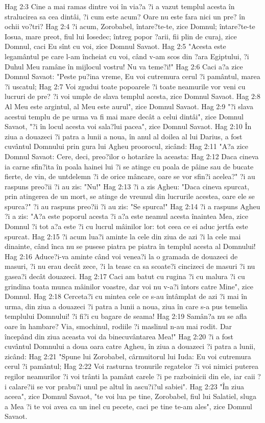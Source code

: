 Hag 2:3  Cine a mai ramas dintre voi în via?a ?i a vazut templul acesta în stralucirea sa cea dintâi, ?i cum este acum? Oare nu este fara nici un pre? în ochii vo?tri?
Hag 2:4  ?i acum, Zorobabel, întare?te-te, zice Domnul; întare?te-te Iosua, mare preot, fiul lui Iosedec; întreg popor ?arii, fii plin de curaj, zice Domnul, caci Eu sînt cu voi, zice Domnul Savaot.
Hag 2:5  "Acesta este legamântul pe care l-am încheiat cu voi, când v-am scos din ?ara Egiptului, ?i Duhul Meu ramâne în mijlocul vostru! Nu va teme?i!"
Hag 2:6  Caci a?a zice Domnul Savaot: "Peste pu?ina vreme, Eu voi cutremura cerul ?i pamântul, marea ?i uscatul;
Hag 2:7  Voi zgudui toate popoarele ?i toate neamurile vor veni cu lucruri de pre? ?i voi umple de slava templul acesta, zice Domnul Savaot.
Hag 2:8  Al Meu este argintul, al Meu este aurul", zice Domnul Savaot.
Hag 2:9  "?i slava acestui templu de pe urma va fi mai mare decât a celui dintâi", zice Domnul Savaot, "?i în locul acesta voi sala?lui pacea", zice Domnul Savaot.
Hag 2:10  În ziua a douazeci ?i patra a lunii a noua, în anul al doilea al lui Darius, a fost cuvântul Domnului prin gura lui Agheu proorocul, zicând:
Hag 2:11  "A?a zice Domnul Savaot: Cere, deci, preo?ilor o hotarâre la aceasta:
Hag 2:12  Daca cineva ia carne sfin?ita în poala hainei lui ?i se atinge cu poala de pâine sau de bucate fierte, de vin, de untdelemn ?i de orice mâncare, oare se vor sfin?i acelea?" ?i au raspuns preo?ii ?i au zis: "Nu!"
Hag 2:13  ?i a zis Agheu: "Daca cineva spurcat, prin atingerea de un mort, se atinge de vreunul din lucrurile acestea, oare ele se spurca?" ?i au raspuns preo?ii ?i au zis: "Se spurca!"
Hag 2:14  ?i a raspuns Agheu ?i a zis: "A?a este poporul acesta ?i a?a este neamul acesta înaintea Mea, zice Domnul ?i tot a?a este ?i cu lucrul mâinilor lor: tot ceea ce ei aduc jertfa este spurcat.
Hag 2:15  ?i acum lua?i aminte la cele din ziua de azi ?i la cele mai dinainte, când înca nu se pusese piatra pe piatra în templul acesta al Domnului!
Hag 2:16  Aduce?i-va aminte când voi venea?i la o gramada de douazeci de masuri, ?i nu erau decât zece, ?i la teasc ca sa scoate?i cincizeci de masuri ?i nu gasea?i decât douazeci.
Hag 2:17  Caci am batut cu rugina ?i cu malura ?i cu grindina toata munca mâinilor voastre, dar voi nu v-a?i întors catre Mine", zice Domnul.
Hag 2:18  Cerceta?i cu mintea cele ce s-au întâmplat de azi ?i mai în urma, din ziua a douazeci ?i patra a lunii a noua, ziua în care s-a pus temelia templului Domnului! ?i fi?i cu bagare de seama!
Hag 2:19  Samân?a nu se afla oare în hambare? Via, smochinul, rodiile ?i maslinul n-au mai rodit. Dar începând din ziua aceasta voi da binecuvântarea Mea!"
Hag 2:20  ?i a fost cuvântul Domnului a doua oara catre Agheu, în ziua a douazeci ?i patra a lunii, zicând:
Hag 2:21  "Spune lui Zorobabel, cârmuitorul lui Iuda: Eu voi cutremura cerul ?i pamântul;
Hag 2:22  Voi rasturna tronurile regatelor ?i voi nimici puterea regilor neamurilor ?i voi trânti la pamânt carele ?i pe razboinicii din ele, iar caii ?i calare?ii se vor prabu?i unul pe altul în ascu?i?ul sabiei".
Hag 2:23  "În ziua aceea", zice Domnul Savaot, "te voi lua pe tine, Zorobabel, fiul lui Salatiel, sluga a Mea ?i te voi avea ca un inel cu pecete, caci pe tine te-am ales", zice Domnul Savaot.



